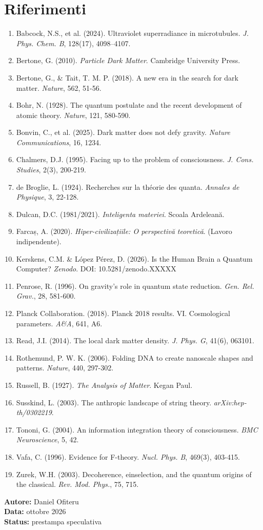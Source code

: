 \section*{Riferimenti}
\begin{enumerate}
    \item Babcock, N.S., et al. (2024). Ultraviolet superradiance in microtubules. \textit{J. Phys. Chem. B}, 128(17), 4098--4107.
    \item Bertone, G. (2010). \textit{Particle Dark Matter}. Cambridge University Press.
    \item Bertone, G., \& Tait, T. M. P. (2018). A new era in the search for dark matter. \textit{Nature}, 562, 51-56.
    \item Bohr, N. (1928). The quantum postulate and the recent development of atomic theory. \textit{Nature}, 121, 580-590.
    \item Bonvin, C., et al. (2025). Dark matter does not defy gravity. \textit{Nature Communications}, 16, 1234.
    \item Chalmers, D.J. (1995). Facing up to the problem of consciousness. \textit{J. Cons. Studies}, 2(3), 200-219.
    \item de Broglie, L. (1924). Recherches sur la théorie des quanta. \textit{Annales de Physique}, 3, 22-128.
    \item Dulcan, D.C. (1981/2021). \textit{Inteligenta materiei}. Scoala Ardeleană.
    \item Farcaș, A. (2020). \textit{Hiper-civilizațiile: O perspectivă teoretică}. (Lavoro indipendente).
    \item Kerskens, C.M. \& López Pérez, D. (2026). Is the Human Brain a Quantum Computer? \textit{Zenodo}. DOI: 10.5281/zenodo.XXXXX
    \item Penrose, R. (1996). On gravity's role in quantum state reduction. \textit{Gen. Rel. Grav.}, 28, 581-600.
    \item Planck Collaboration. (2018). Planck 2018 results. VI. Cosmological parameters. \textit{A\&A}, 641, A6.
    \item Read, J.I. (2014). The local dark matter density. \textit{J. Phys. G}, 41(6), 063101.
    \item Rothemund, P. W. K. (2006). Folding DNA to create nanoscale shapes and patterns. \textit{Nature}, 440, 297-302.
    \item Russell, B. (1927). \textit{The Analysis of Matter}. Kegan Paul.
    \item Susskind, L. (2003). The anthropic landscape of string theory. \textit{arXiv:hep-th/0302219}.
    \item Tononi, G. (2004). An information integration theory of consciousness. \textit{BMC Neuroscience}, 5, 42.
    \item Vafa, C. (1996). Evidence for F-theory. \textit{Nucl. Phys. B}, 469(3), 403-415.
    \item Zurek, W.H. (2003). Decoherence, einselection, and the quantum origins of the classical. \textit{Rev. Mod. Phys.}, 75, 715.
\end{enumerate}

\vspace{1cm}
\begin{flushright}
\textbf{Autore:} Daniel Ofiteru \\
\textbf{Data:} ottobre 2026 \\
\textbf{Status:} prestampa speculativa
\end{flushright}


